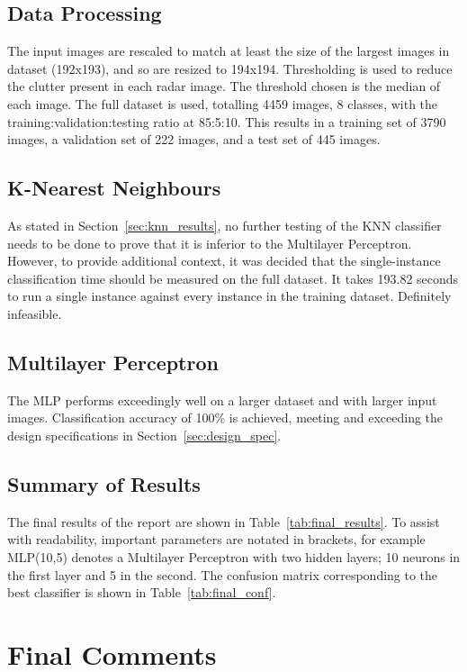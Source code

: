 \subsection{Data Processing}
The input images are rescaled to match at least the size of the largest images in dataset (192x193), and so are resized to 194x194. Thresholding is used to reduce the clutter present in each radar image. The threshold chosen is the median of each image. The full dataset is used, totalling 4459 images, 8 classes, with the training:validation:testing ratio at 85:5:10. This results in a training set of 3790 images, a validation set of 222 images, and a test set of 445 images.


\subsection{K-Nearest Neighbours}
As stated in Section~\ref{sec:knn_results}, no further testing of the KNN classifier needs to be done to prove that it is inferior to the Multilayer Perceptron. However, to provide additional context, it was decided that the single-instance classification time should be measured on the full dataset. It takes 193.82 seconds to run a single instance against every instance in the training dataset. Definitely infeasible.


\subsection{Multilayer Perceptron}
The MLP performs exceedingly well on a larger dataset  and with larger input images. Classification accuracy of 100\% is achieved, meeting and exceeding the design specifications in Section~\ref{sec:design_spec}.



\subsection{Summary of Results}

The final results of the report are shown in Table~\ref{tab:final_results}. To assist with readability, important parameters are notated in brackets, for example MLP(10,5) denotes a Multilayer Perceptron with two hidden layers; 10 neurons in the first layer and 5 in the second. The confusion matrix corresponding to the best classifier is shown in Table~\ref{tab:final_conf}.

\section{Final Comments}
